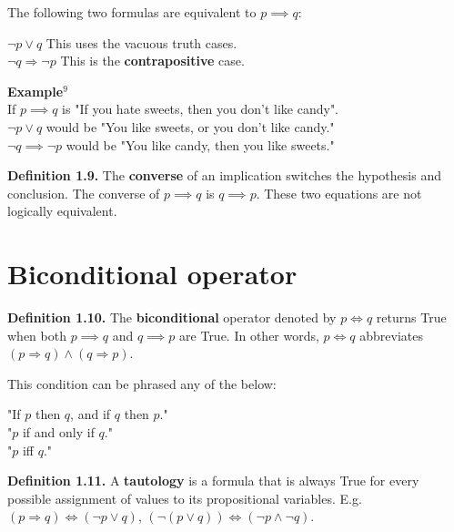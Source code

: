 \documentclass{article}
\begin{document}
The following two formulas are equivalent to $p \implies q$:

$\neg p \lor q$ \hfill This uses the vacuous truth cases. \\
$\neg q \Rightarrow \neg p$ \hfill This is the \textbf{contrapositive} case.

\textbf{Example$^{9}$} \\
If $p \implies q$ is \hfill "If you hate sweets, then you don't like candy". \\
$\neg p \lor q$ would be \hfill "You like sweets, or you don't like candy." \\
$\neg q \implies \neg p$ would be \hfill "You like candy, then you like sweets."

\textbf{Definition 1.9.} The \textbf{converse} of an implication switches
the hypothesis and conclusion. The converse of $p \implies q$ is $q \implies p$.
These two equations are not logically equivalent.

\section{Biconditional operator}
\textbf{Definition 1.10.} The \textbf{biconditional} operator denoted by $p \iff q$ 
returns True when both $p \implies q$ and $q \implies p$ are True. In other words,
$p \iff q$ abbreviates $(p \Rightarrow q) \land (q \Rightarrow p)$.

This condition can be phrased any of the below: 
\begin{center}
"If $p$ then $q$, and if $q$ then $p$." \\
"$p$ if and only if $q$." \\
"$p$ iff $q$."
\end{center}

\textbf{Definition 1.11.} A \textbf{tautology} is a formula that is always
True for every possible assignment of values to its propositional variables. E.g. 
$(p \Rightarrow q) \Leftrightarrow (\neg p \lor q)$, $(\neg(p\lor q)) 
\Leftrightarrow (\neg p \land \neg q)$.
\end{document}
